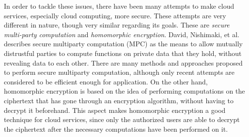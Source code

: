 In order to tackle these issues, there have been many attempts to make cloud services, especially cloud computing, more secure. These attempts are very different in nature, though very similar regarding its goals. These are \textit{secure multi-party computation} and \textit{homomorphic encryption}. David, Nishimaki, et al. \cite{cryptoeprint:2015:135} describes secure multiparty computation (MPC) as the means to allow mutually distrustful parties to compute functions on private data that they hold, without revealing data to each other. There are many methods and approaches proposed to perform secure multiparty computation, although only recent attempts are considered to be efficient enough for application. On the other hand, homomorphic encryption is based on the idea of performing computations on the ciphertext that has gone through an encryption algorithm, without having to decrypt it beforehand. This aspect makes homomorphic encryption a good technique for cloud services, since only the authorized users are able to decrypt the ciphertext after the necessary computations have been performed on it.


\clearpage
